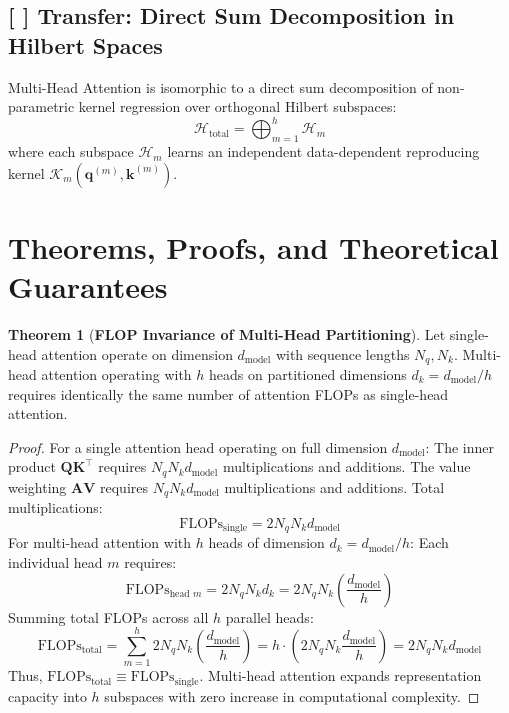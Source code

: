 \documentclass[11pt,a4paper]{article}
\theoremstyle{definition}
\newtheorem{theorem}{\textbf{Theorem}}[section]
\begin{document}
\subsection{[ ] Transfer: Direct Sum Decomposition in Hilbert Spaces}
Multi-Head Attention is isomorphic to a direct sum decomposition of non-parametric kernel regression over orthogonal Hilbert subspaces:
{\boldmath
\begin{equation}
\mathcal{H}_{\text{total}} = \bigoplus_{m=1}^h \mathcal{H}_m
\end{equation}
}
where each subspace $\mathcal{H}_m$ learns an independent data-dependent reproducing kernel $\mathcal{K}_m(\mathbf{q}^{(m)}, \mathbf{k}^{(m)})$.

\section{Theorems, Proofs, and Theoretical Guarantees}

\begin{theorem}[\textbf{FLOP Invariance of Multi-Head Partitioning}]
Let single-head attention operate on dimension $d_{\text{model}}$ with sequence lengths $N_q, N_k$. Multi-head attention operating with $h$ heads on partitioned dimensions $d_k = d_{\text{model}} / h$ requires identically the same number of attention FLOPs as single-head attention.
\end{theorem}

\begin{proof}
For a single attention head operating on full dimension $d_{\text{model}}$:
The inner product $\mathbf{Q}\mathbf{K}^\top$ requires $N_q N_k d_{\text{model}}$ multiplications and additions. The value weighting $\mathbf{A}\mathbf{V}$ requires $N_q N_k d_{\text{model}}$ multiplications and additions. Total multiplications:
{\boldmath
\begin{equation}
\text{FLOPs}_{\text{single}} = 2 N_q N_k d_{\text{model}}
\end{equation}
}
For multi-head attention with $h$ heads of dimension $d_k = d_{\text{model}} / h$:
Each individual head $m$ requires:
{\boldmath
\begin{equation}
\text{FLOPs}_{\text{head } m} = 2 N_q N_k d_k = 2 N_q N_k \left(\frac{d_{\text{model}}}{h}\right)
\end{equation}
}
Summing total FLOPs across all $h$ parallel heads:
{\boldmath
\begin{equation}
\text{FLOPs}_{\text{total}} = \sum_{m=1}^h 2 N_q N_k \left(\frac{d_{\text{model}}}{h}\right) = h \cdot \left( 2 N_q N_k \frac{d_{\text{model}}}{h} \right) = 2 N_q N_k d_{\text{model}}
\end{equation}
}
Thus, $\text{FLOPs}_{\text{total}} \equiv \text{FLOPs}_{\text{single}}$. Multi-head attention expands representation capacity into $h$ subspaces with zero increase in computational complexity.
\end{proof}
\end{document}
